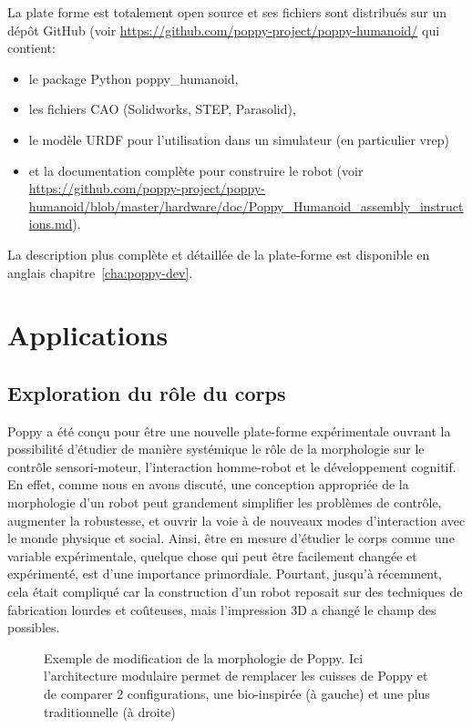 La plate forme est totalement open source et ses fichiers sont distribués sur un dépôt GitHub (voir \url{https://github.com/poppy-project/poppy-humanoid/} qui contient:

\begin{itemize}
  \item le package Python poppy\_humanoid,
  \item les fichiers CAO (Solidworks, STEP, Parasolid),
  \item le modèle URDF pour l'utilisation dans un simulateur (en particulier vrep) 
  \item et la documentation complète pour construire le robot (voir \url{https://github.com/poppy-project/poppy-humanoid/blob/master/hardware/doc/Poppy_Humanoid_assembly_instructions.md}).
\end{itemize}

La description plus complète et détaillée de la plate-forme est disponible en anglais chapitre~\ref{cha:poppy-dev}.



\section*{Applications} %


\subsection*{Exploration du rôle du corps} %
Poppy a été conçu pour être une nouvelle plate-forme expérimentale ouvrant la possibilité d'étudier de manière systémique le rôle de la morphologie sur le contrôle sensori-moteur, l'interaction homme-robot et le développement cognitif. En effet, comme nous en avons discuté, une conception appropriée de la morphologie d'un robot peut grandement simplifier les problèmes de contrôle, augmenter la robustesse, et ouvrir la voie à de nouveaux modes d'interaction avec le monde physique et social. Ainsi, être en mesure d'étudier le corps comme une variable expérimentale, quelque chose qui peut être facilement changée et expérimenté, est d'une importance primordiale. Pourtant, jusqu'à récemment, cela était compliqué car la construction d'un robot reposait sur des techniques de fabrication lourdes et coûteuses, mais l'impression 3D a changé le champ des possibles.

\begin{figure}[!t]
\centering
    \hfil
    \caption{Exemple de modification de la morphologie de Poppy. Ici l'architecture modulaire permet de remplacer les cuisses de Poppy et de comparer 2 configurations, une bio-inspirée (à gauche) et une plus traditionnelle (à droite)}
\end{figure}

